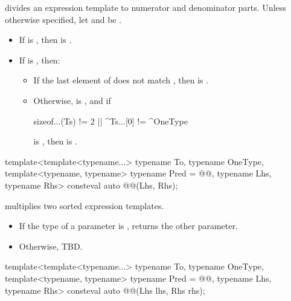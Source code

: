 \pnum
{} divides an expression template to numerator and denominator parts.
Unless otherwise specified, let  and  be .
\begin{itemize}
\item
If  is , then  is .
\item
If  is , then:
\begin{itemize}
\item
If the last element of  does not match ,
then  is .
\item
Otherwise,  is , and if
\begin{codeblock}
sizeof...(Ts) != 2 || ^Ts...[0] != ^OneType
\end{codeblock}
is , then
 is .
\end{itemize}
\end{itemize}

\begin{itemdecl}
template<template<typename...> typename To, typename OneType,
         template<typename, typename> typename Pred = @@, typename Lhs, typename Rhs>
consteval auto @@(Lhs, Rhs);
\end{itemdecl}

\begin{itemdescr}
\pnum
{} multiplies two sorted expression templates.

\pnum
\returns
\begin{itemize}
\item
If the type of a parameter is , returns the other parameter.
\item
Otherwise,
TBD.
\end{itemize}
\end{itemdescr}

\begin{itemdecl}
template<template<typename...> typename To, typename OneType,
         template<typename, typename> typename Pred = @@, typename Lhs, typename Rhs>
consteval auto @@(Lhs lhs, Rhs rhs);
\end{itemdecl}

